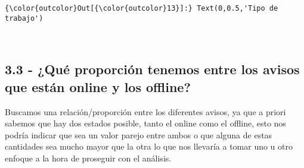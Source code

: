 \documentclass[11pt]{article}
\begin{document}
\begin{Verbatim}[commandchars=\\\{\}]
{\color{outcolor}Out[{\color{outcolor}13}]:} Text(0,0.5,'Tipo de trabajo')
\end{Verbatim}
            
    \begin{center}
    \end{center}
    { \hspace*{\fill} \\}
    
    \hypertarget{quuxe9-proporciuxf3n-tenemos-entre-los-avisos-que-estuxe1n-online-y-los-offline}{%
\subsection{3.3 - ¿Qué proporción tenemos entre los avisos que están
online y los
offline?}\label{quuxe9-proporciuxf3n-tenemos-entre-los-avisos-que-estuxe1n-online-y-los-offline}}

Buscamos una relación/proporción entre los diferentes avisos, ya que a
priori sabemos que hay dos estados posible, tanto el online como el
offline, esto nos podría indicar que sea un valor parejo entre ambos o
que alguna de estas cantidades sea mucho mayor que la otra lo que nos
llevaría a tomar uno u otro enfoque a la hora de proseguir con el
análisis.
\end{document}
